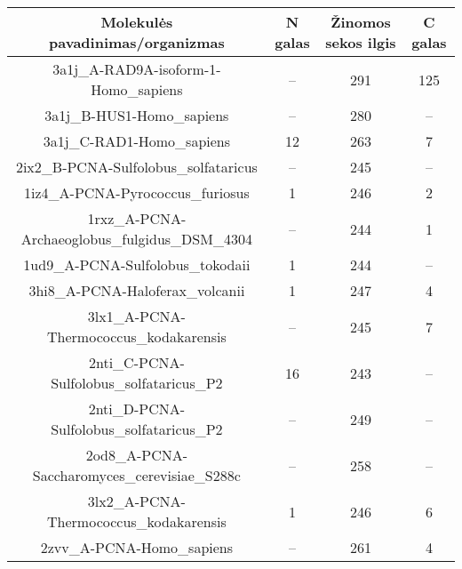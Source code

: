 \documentclass[a4paper,12pt]{article}
\begin{document}
\begin{frame}
\centering
\hspace*{-2cm}
\begin{tabular}{|c|c|c|c|} \hline
\textbf{ Molekulės pavadinimas/organizmas } & \textbf{N galas} &  
\textbf{Žinomos sekos ilgis} &  \textbf{C galas} 			\\ \hline

3a1j\_A-RAD9A-isoform-1-Homo\_sapiens & -- & 291 & 125 				\\ \hline

3a1j\_B-HUS1-Homo\_sapiens & -- & 280 & -- 							\\ \hline

3a1j\_C-RAD1-Homo\_sapiens & 12 & 263 & 7 							\\ \hline

2ix2\_B-PCNA-Sulfolobus\_solfataricus & -- & 245 & -- 				\\ \hline

1iz4\_A-PCNA-Pyrococcus\_furiosus & 1 & 246 & 2 						\\ \hline

1rxz\_A-PCNA-Archaeoglobus\_fulgidus\_DSM\_4304 & -- & 244 & 1 		\\ \hline

1ud9\_A-PCNA-Sulfolobus\_tokodaii & 1 & 244 & -- 					\\ \hline

3hi8\_A-PCNA-Haloferax\_volcanii & 1 & 247 & 4 						\\ \hline

3lx1\_A-PCNA-Thermococcus\_kodakarensis & -- & 245 & 7 				\\ \hline

2nti\_C-PCNA-Sulfolobus\_solfataricus\_P2 & 16 & 243 & -- 			\\ \hline

2nti\_D-PCNA-Sulfolobus\_solfataricus\_P2 & -- & 249 & -- 			\\ \hline

2od8\_A-PCNA-Saccharomyces\_cerevisiae\_S288c & -- & 258 & -- 		\\ \hline

3lx2\_A-PCNA-Thermococcus\_kodakarensis & 1 & 246 & 6 				\\ \hline

2zvv\_A-PCNA-Homo\_sapiens & -- & 261 & 4 							\\ \hline
\end{tabular} 
\end{frame}\\
\end{document}
